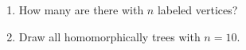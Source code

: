 
\begin{frame}
\end{frame}

\begin{frame}{}

  \pause
  \vspace{0.30cm}
  \begin{exampleblock}{}
    \begin{enumerate}[(1)]
      \setlength{\itemsep}{6pt}
      \item How many  are there with $n$ labeled vertices?
        \qquad {}
      \item Draw all homomorphically  trees with $n = 10$.
        \qquad {}
    \end{enumerate}
  \end{exampleblock}
\end{frame}
